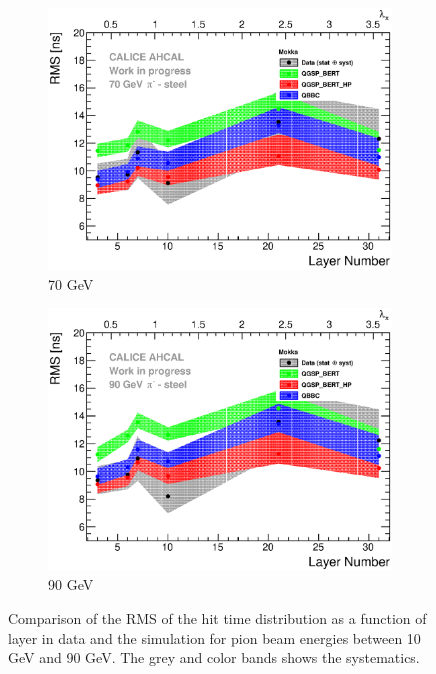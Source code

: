 \begin{figure}[htbp!]
  \hfill
  \begin{subfigure}[t]{0.49\textwidth}
    \centering
    \includegraphics[width=1\textwidth]{../Thesis_Plots/Timing/Pions/Plots/ComparisonToSim/RMS_Depth_70GeV_Mokka.eps}
    \caption{70 GeV}\label{fig:Depth_RMS_SimData_70GeV_Mokka}
  \end{subfigure}
  \hfill
  \begin{subfigure}[t]{0.49\textwidth}
    \centering
    \includegraphics[width=1\textwidth]{../Thesis_Plots/Timing/Pions/Plots/ComparisonToSim/RMS_Depth_90GeV_Mokka.eps}
    \caption{90 GeV}\label{fig:Depth_RMS_SimData_90GeV_Mokka}
  \end{subfigure}
  \caption{Comparison of the RMS of the hit time distribution as a function of layer in data and the \mokka simulation for pion beam energies between 10 GeV and 90 GeV. The grey and color bands shows the systematics.}
  \label{fig:Depth_RMS_SimData_Comparison_Mokka}
\end{figure}


